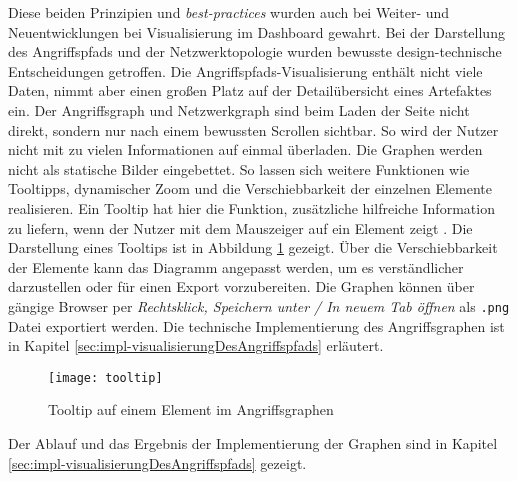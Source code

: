 %
\par Diese beiden Prinzipien und \textit{best-practices} wurden auch bei Weiter- und Neuentwicklungen bei Visualisierung im Dashboard gewahrt. Bei der Darstellung des Angriffspfads und der Netzwerktopologie wurden bewusste design-technische Entscheidungen getroffen. Die Angriffspfads-Visualisierung enthält nicht viele Daten, nimmt aber einen großen Platz auf der Detailübersicht eines Artefaktes ein. Der Angriffsgraph und Netzwerkgraph sind beim Laden der Seite nicht direkt, sondern nur nach einem bewussten Scrollen sichtbar. So wird der Nutzer nicht mit zu vielen Informationen auf einmal überladen. Die Graphen werden nicht als statische Bilder eingebettet. So lassen sich weitere Funktionen wie Tooltipps, dynamischer Zoom und die Verschiebbarkeit der einzelnen Elemente realisieren. Ein Tooltip hat hier die Funktion, zusätzliche hilfreiche Information zu liefern, wenn der Nutzer mit dem Mauszeiger auf ein Element zeigt \autocite{TooltipCarbonDesign}. Die Darstellung eines Tooltips ist in Abbildung \ref{fig:tooltip} gezeigt. Über die Verschiebbarkeit der Elemente kann das Diagramm angepasst werden, um es verständlicher darzustellen oder für einen Export vorzubereiten. Die Graphen können über gängige Browser per \textit{Rechtsklick, Speichern unter / In neuem Tab öffnen} als \verb|.png| Datei exportiert werden. Die technische Implementierung des Angriffsgraphen ist in Kapitel \ref{sec:impl-visualisierungDesAngriffspfads} erläutert.
%
\begin{figure}[H]
    \centering
    \texttt{[image: tooltip]}
    \caption{Tooltip auf einem Element im Angriffsgraphen}
    \label{fig:tooltip}
\end{figure}
%
\par Der Ablauf und das Ergebnis der Implementierung der Graphen sind in Kapitel \ref{sec:impl-visualisierungDesAngriffspfads} gezeigt.
